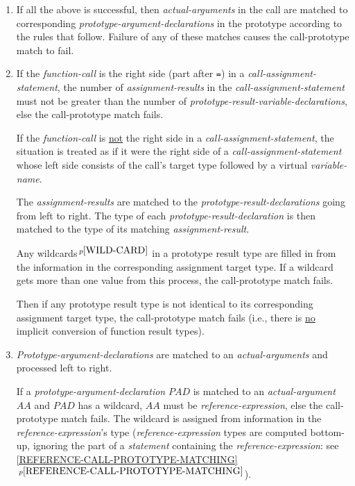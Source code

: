 \documentclass[12pt]{article}
\newcommand{\itemref}[1]{\ref{#1}$\,^{p\pageref{#1}}$}
\newcommand{\pagnote}[1]{$\,^{p\pageref{#1}}$}
\begin{document}
\begin{enumerate}
At this point the {\em pattern-argument-lists} in the prototype
{\em pattern-term} must match in order all the {\em call-argument-lists}
in the {\em call-term}, both in
type of brackets (either `{\tt (~)}' or `{\tt [~]}') and in number
of arguments, else the call-prototype match fails.

\item If all the above is successful, then {\em actual-arguments}
in the call are matched to corresponding {\em prototype-argument-declarations}
in the prototype according to the rules that follow.
Failure of any of these matches causes
the call-prototype match to fail.

\item\label{CALL-PROTOTYPE-RESULT-MATCHING}
If the {\em function-call} is the right side (part after {\tt =})
in a {\em call-assignment-statement},
the number of {\em assignment-results} in the {\em call-assignment-statement}
must not be greater than the number of
{\em prototype-result-variable-declarations}, else the call-prototype
match fails.

If the {\em function-call} is \underline{not} the right side in a
{\em call-assignment-statement}, the situation is treated as if
it were the right side of a {\em call-assignment-statement}
whose left side consists of the call's target type
followed by a virtual {\em variable-name}.

The {\em assignment-results} are matched to the
{\em prototype-result-declarations} going from left to right.
The type of each {\em prototype-result-declaration} is then
matched to the type of its matching {\em assignment-result}.

Any wildcards\pagnote{WILD-CARD}
in a prototype result type are filled in from the information
in the corresponding assignment target type.  If a wildcard gets more
than one value from this process, the call-prototype match fails.

Then if any prototype result type is not identical to its corresponding
assignment target type, the call-prototype match fails
(i.e., there is \underline{no} implicit conversion of function result
types).

\item\label{CALL-PROTOTYPE-ARGUMENT-MATCHING}
{\em Prototype-argument-declarations} are matched to
an {\em actual-arguments} and processed left to right.

If a {\em prototype-argument-declaration} $PAD$ is matched
to an {\em actual-argument} $AA$ and $PAD$ has a wildcard,
$AA$ must be {\em reference-expression}, else the
call-prototype match fails.  The wildcard is assigned from
information in the {\em reference-expression}'s type
({\em reference-expression} types are computed bottom-up,
ignoring the part of a {\em statement} containing the
{\em reference-expression}:
see \itemref{REFERENCE-CALL-PROTOTYPE-MATCHING}).


\end{enumerate}
\end{document}
